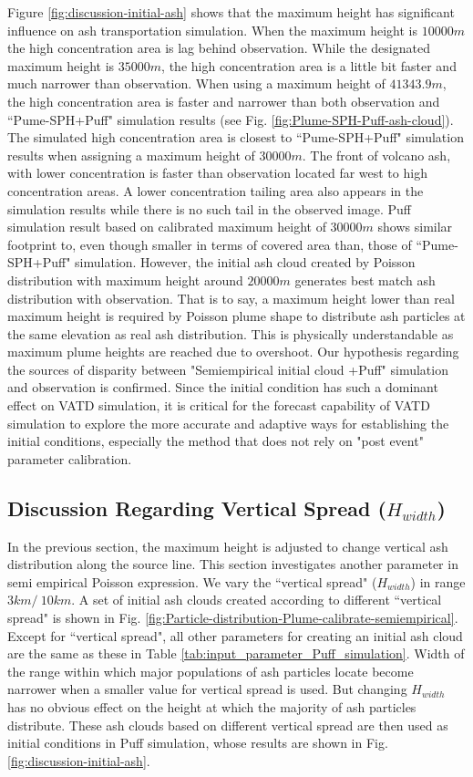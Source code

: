 \documentclass[utf8]{frontiersSCNS} %
\begin{document}
Figure \ref{fig:discussion-initial-ash} shows that the maximum height has significant influence on ash transportation simulation. When the maximum height is $10000 m$ the high concentration area is lag behind observation. While the designated maximum height is $35000 m$, the high concentration area is a little bit faster and much narrower than observation. When using a maximum height of $41343.9 m$, the high concentration area is faster and narrower than both observation and ``Pume-SPH+Puff" simulation results (see Fig. \ref{fig:Plume-SPH-Puff-ash-cloud}). The simulated high concentration area is closest to ``Pume-SPH+Puff" simulation results when assigning a maximum height of $30000 m$. The front of volcano ash, with lower concentration is faster than observation located far west to high concentration areas. A lower concentration tailing area also appears in the simulation results while there is no such tail in the observed image. Puff simulation result based on calibrated maximum height of $30000 m$ shows similar footprint to, even though smaller in terms of covered area than, those of ``Pume-SPH+Puff" simulation. However, the initial ash cloud created by Poisson distribution with maximum height around $20000 m$ generates best match ash distribution with observation. That is to say, a maximum height lower than real maximum height is required by Poisson plume shape to distribute ash particles at the same elevation as real ash distribution. This is physically understandable as maximum plume heights are reached due to overshoot.
Our hypothesis regarding the sources of disparity between "Semiempirical initial cloud +Puff" simulation and observation is confirmed. Since the initial condition has such a dominant effect on VATD simulation, it is critical for the forecast capability of VATD simulation to explore the more accurate and adaptive ways for establishing the initial conditions, especially the method that does not rely on "post event" parameter calibration.

\subsection{Discussion Regarding Vertical Spread ($H_{width}$)}
In the previous section, the maximum height is adjusted to change vertical ash distribution along the source line. This section investigates another parameter in semi empirical Poisson expression. We vary the ``vertical spread" ($H_{width}$) in range $3 km /~ 10 km$. A set of initial ash clouds created according to different ``vertical spread" is shown in Fig. \ref{fig:Particle-distribution-Plume-calibrate-semiempirical}. Except for ``vertical spread", all other parameters for creating an initial ash cloud are the same as these in Table \ref{tab:input_parameter_Puff_simulation}. Width of the range within which major populations of ash particles locate become narrower when a smaller value for vertical spread is used. But changing $H_{width}$ has no obvious effect on the height at which the majority of ash particles distribute. These ash clouds based on different vertical spread are then used as initial conditions in Puff simulation, whose results are shown in Fig. \ref{fig:discussion-initial-ash}.
\end{document}
